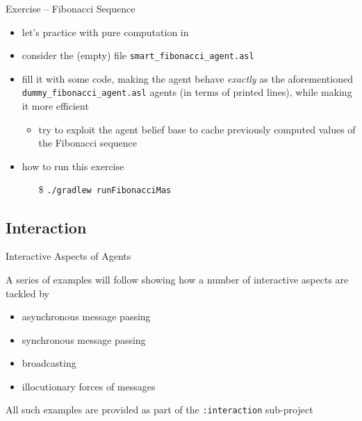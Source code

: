\documentclass[presentation]{beamer}\mode<presentation>{\usetheme{AMSBolognaFC}}
\begin{document}
\startExercise
\begin{frame}[c, allowframebreaks]{Exercise \currentExercise{} -- Fibonacci Sequence}
    \begin{itemize}
        \item let's practice with pure computation in \jason{}
        
        \vspace{.3cm}
        
        \item consider the (empty) file \texttt{smart\_fibonacci\_agent.asl}
        
        \vspace{.3cm}
        
        \item fill it with some \jason{} code, making the agent behave \emph{exactly} as the aforementioned \texttt{dummy\_fibonacci\_agent.asl} agents (in terms of printed lines), while making it more efficient
        \begin{itemize}
            \item try to exploit the agent belief base to cache previously computed values of the Fibonacci sequence
        \end{itemize}
        
        \vspace{.3cm}
        
        \item how to run this exercise
        \begin{itemize}
            \item[\$] \texttt{./gradlew run\alert{Fibonacci}Mas}
        \end{itemize}
        
    \end{itemize}
\end{frame}

\subsection{Interaction}

\begin{frame}[c]{Interactive Aspects of \jason{} Agents}

A series of examples will follow showing how a number of interactive aspects are tackled by \jason{}
%
\begin{itemize}
    \item asynchronous message passing
    \item synchronous message passing
    \item broadcasting
    \item illocutionary forces of \jason{} messages
\end{itemize}

\vfill

All such examples are provided as part of the \texttt{:interaction} sub-project

\end{frame} 
\end{document}
